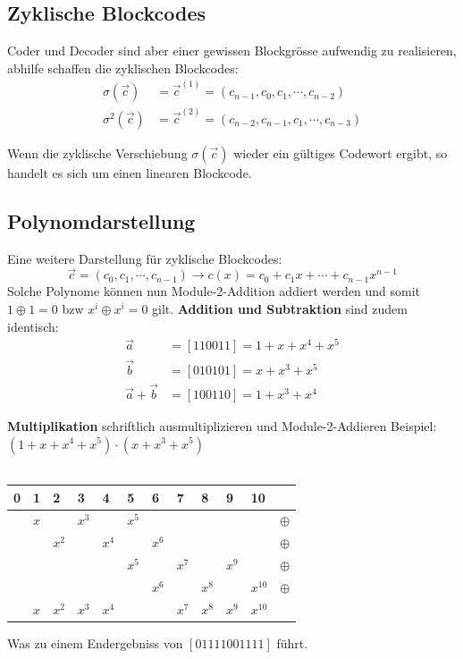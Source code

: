 \subsection{Zyklische Blockcodes}
 Coder und Decoder sind aber einer gewissen Blockgrösse aufwendig zu realisieren, abhilfe schaffen die zyklischen Blockcodes:
\begin{align*}
	\sigma(\vec{c}) &= \vec{c}^{(1)} = \left(c_{n-1}, c_0, c_1, \cdots, c_{n-2}\right) \\	
	\sigma^2(\vec{c}) &= \vec{c}^{(2)} = \left(c_{n-2}, c_{n-1}, c_1, \cdots, c_{n-3}\right)
\end{align*}

Wenn die zyklische Verschiebung $\sigma(\vec{c})$ wieder ein gültiges Codewort ergibt, so handelt es sich um einen linearen Blockcode.

\subsection{Polynomdarstellung}
Eine weitere Darstellung für zyklische Blockcodes:
\[
\vec{c} = \left(c_0, c_1, \cdots, c_{n-1}\right) \xrightarrow{} c(x) = c_0 + c_1x + \cdots + c_{n-1}x^{n-1}
\]
Solche Polynome können nun Module-2-Addition addiert werden und somit $1 \oplus 1 = 0$ bzw $x^i \oplus x^i = 0$ gilt. \textbf{Addition und Subtraktion} sind zudem identisch:
\begin{align*}
	\vec{a} &= [110011] = 1 + x + x^4 +x^5 \\
	\vec{b} &= [010101] = x + x^3 + x^5 \\
	\vec{a} + \vec{b} &= [100110] = 1 + x^3 + x^4
\end{align*}

\textbf{Multiplikation}  schriftlich ausmultiplizieren und Module-2-Addieren 
Beispiel: $(1 + x + x^4 +x^5)\cdot(x+x^3+x^5)$~\\~\\
\begin{tabular}{lllllllllll|l}
	0 & 1 & 2 & 3 & 4 & 5 & 6 & 7 & 8 & 9 & 10 &\\ \toprule
& $x$ & & $x^3$ & & $x^5$ &&&& & & $\oplus$ \\
&& $x^2$ && $x^4$ && $x^6$ &&&& & $\oplus$\\
&&&&& $x^5$ && $x^7$ && $x^9$ & & $\oplus$\\
&&&&&& $x^6$ && $x^8$ && $x^{10}$ & $\oplus$\\ \midrule
& $x$ & $x^2$ & $x^3$ & $x^4$ &&& $x^7$ & $x^8$ & $x^9$ & $x^{10}$
\end{tabular}
Was zu einem Endergebniss von $[01111001111]$ führt.

